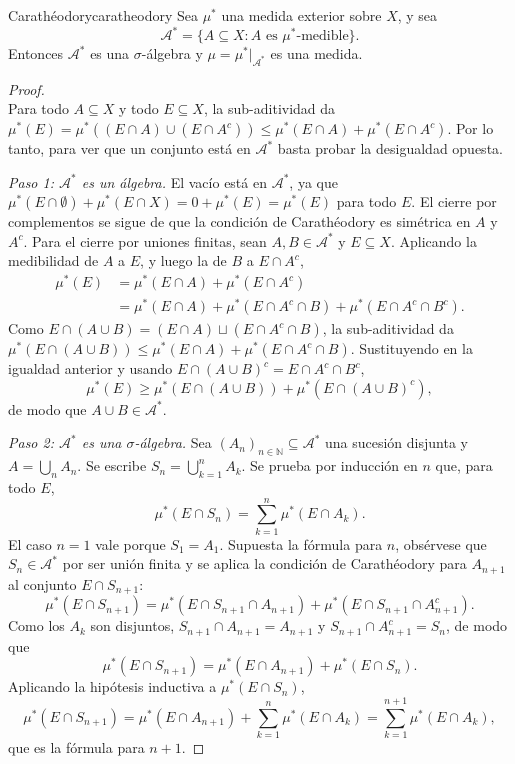 \documentclass[11pt, a4paper]{article}
\begin{document}
\begin{teorema}{Carathéodory}{caratheodory}
Sea $\mu^*$ una medida exterior sobre $X$, y sea
$$ \mathcal{A}^* = \{ A \subseteq X : A \text{ es } \mu^*\text{-medible} \}. $$
Entonces $\mathcal{A}^*$ es una $\sigma$-álgebra y $\mu = \mu^*|_{\mathcal{A}^*}$ es una medida.
\end{teorema}

\begin{proof}\leavevmode\\
Para todo $A \subseteq X$ y todo $E \subseteq X$, la sub-aditividad da $\mu^*(E) = \mu^*((E \cap A) \cup (E \cap A^c)) \le \mu^*(E \cap A) + \mu^*(E \cap A^c)$. Por lo tanto, para ver que un conjunto está en $\mathcal{A}^*$ basta probar la desigualdad opuesta.

\textit{Paso 1: $\mathcal{A}^*$ es un álgebra.} El vacío está en $\mathcal{A}^*$, ya que $\mu^*(E \cap \emptyset) + \mu^*(E \cap X) = 0 + \mu^*(E) = \mu^*(E)$ para todo $E$. El cierre por complementos se sigue de que la condición de Carathéodory es simétrica en $A$ y $A^c$. Para el cierre por uniones finitas, sean $A, B \in \mathcal{A}^*$ y $E \subseteq X$. Aplicando la medibilidad de $A$ a $E$, y luego la de $B$ a $E \cap A^c$,
\begin{align*}
\mu^*(E) &= \mu^*(E \cap A) + \mu^*(E \cap A^c) \\
&= \mu^*(E \cap A) + \mu^*(E \cap A^c \cap B) + \mu^*(E \cap A^c \cap B^c).
\end{align*}
Como $E \cap (A \cup B) = (E \cap A) \sqcup (E \cap A^c \cap B)$, la sub-aditividad da $\mu^*(E \cap (A \cup B)) \le \mu^*(E \cap A) + \mu^*(E \cap A^c \cap B)$. Sustituyendo en la igualdad anterior y usando $E \cap (A \cup B)^c = E \cap A^c \cap B^c$,
$$ \mu^*(E) \ge \mu^*(E \cap (A \cup B)) + \mu^*(E \cap (A \cup B)^c), $$
de modo que $A \cup B \in \mathcal{A}^*$.

\textit{Paso 2: $\mathcal{A}^*$ es una $\sigma$-álgebra.} Sea $(A_n)_{n \in \mathbb{N}} \subseteq \mathcal{A}^*$ una sucesión disjunta y $A = \bigcup_n A_n$. Se escribe $S_n = \bigcup_{k=1}^n A_k$. Se prueba por inducción en $n$ que, para todo $E$,
$$ \mu^*(E \cap S_n) = \sum_{k=1}^n \mu^*(E \cap A_k). $$
El caso $n = 1$ vale porque $S_1 = A_1$. Supuesta la fórmula para $n$, obsérvese que $S_n \in \mathcal{A}^*$ por ser unión finita y se aplica la condición de Carathéodory para $A_{n+1}$ al conjunto $E \cap S_{n+1}$:
$$ \mu^*(E \cap S_{n+1}) = \mu^*(E \cap S_{n+1} \cap A_{n+1}) + \mu^*(E \cap S_{n+1} \cap A_{n+1}^c). $$
Como los $A_k$ son disjuntos, $S_{n+1} \cap A_{n+1} = A_{n+1}$ y $S_{n+1} \cap A_{n+1}^c = S_n$, de modo que
$$ \mu^*(E \cap S_{n+1}) = \mu^*(E \cap A_{n+1}) + \mu^*(E \cap S_n). $$
Aplicando la hipótesis inductiva a $\mu^*(E \cap S_n)$,
$$ \mu^*(E \cap S_{n+1}) = \mu^*(E \cap A_{n+1}) + \sum_{k=1}^n \mu^*(E \cap A_k) = \sum_{k=1}^{n+1} \mu^*(E \cap A_k), $$
que es la fórmula para $n+1$.


\end{proof}
\end{document}
